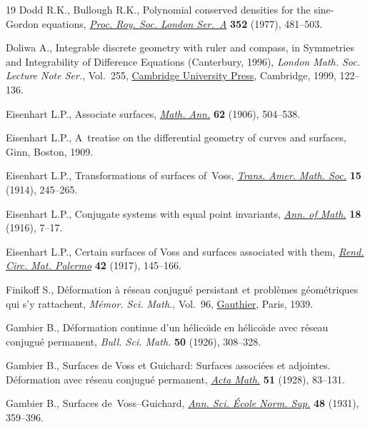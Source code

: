 \documentclass[pdftex]{sigma}
\numberwithin{equation}{section}
\theoremstyle{definition}
\begin{document}
\begin{thebibliography}{19}
Dodd R.K., Bullough R.K., Polynomial conserved densities for the sine-{G}ordon
 equations, \href{https://doi.org/10.1098/rspa.1977.0012}{\textit{Proc. Roy.
 Soc. London Ser.~A}} \textbf{352} (1977), 481--503.

Doliwa A., Integrable discrete geometry with ruler and compass, in Symmetries
 and {I}ntegrability of {D}ifference {E}quations ({C}anterbury, 1996),
 \textit{London Math. Soc. Lecture Note Ser.}, Vol.~255,
 \href{https://doi.org/10.1017/CBO9780511569432.011}{Cambridge University
 Press}, Cambridge, 1999, 122--136.

Eisenhart L.P., Associate surfaces,
 \href{https://doi.org/10.1007/BF01449817}{\textit{Math. Ann.}} \textbf{62}
 (1906), 504--538.

Eisenhart L.P., A~treatise on the differential geometry of curves and surfaces,
 Ginn, Boston, 1909.

Eisenhart L.P., Transformations of surfaces of~{V}oss,
 \href{https://doi.org/10.2307/1988587}{\textit{Trans. Amer. Math. Soc.}}
 \textbf{15} (1914), 245--265.

Eisenhart L.P., Conjugate systems with equal point invariants,
 \href{https://doi.org/10.2307/2007145}{\textit{Ann. of Math.}} \textbf{18}
 (1916), 7--17.

Eisenhart L.P., Certain surfaces of {V}oss and surfaces associated with them,
 \href{https://doi.org/10.1007/BF03014896}{\textit{Rend. Circ. Mat. Palermo}}
 \textbf{42} (1917), 145--166.

Finikoff S., D\'eformation \`a r\'eseau conjugu\'e persistant et probl\`emes
 g\'eom\'etriques qui s'y rattachent, \textit{M\'emor. Sci. Math.}, Vol.~96,
 \href{https://www.numdam.org/item/MSM_1939__96__1_0/}{Gauthier}, Paris, 1939.

Gambier B., D\'eformation continue d'un h\'elico\"{\i}de en h\'elico\"{\i}de
 avec r\'eseau conjugu\'e permanent, \textit{Bull. Sci. Math.} \textbf{50}
 (1926), 308--328.

Gambier B., Surfaces de {V}oss et {G}uichard: {S}urfaces associ\'ees et
 adjointes. {D}\'eformation avec r\'eseau conjugu\'e permanent,
 \href{https://doi.org/10.1007/BF02545661}{\textit{Acta Math.}} \textbf{51}
 (1928), 83--131.

Gambier B., Surfaces de~{V}oss--{G}uichard,
 \href{https://doi.org/10.24033/asens.813}{\textit{Ann. Sci. \'{E}cole Norm.
 Sup.}} \textbf{48} (1931), 359--396.


\end{thebibliography}
\end{document}
